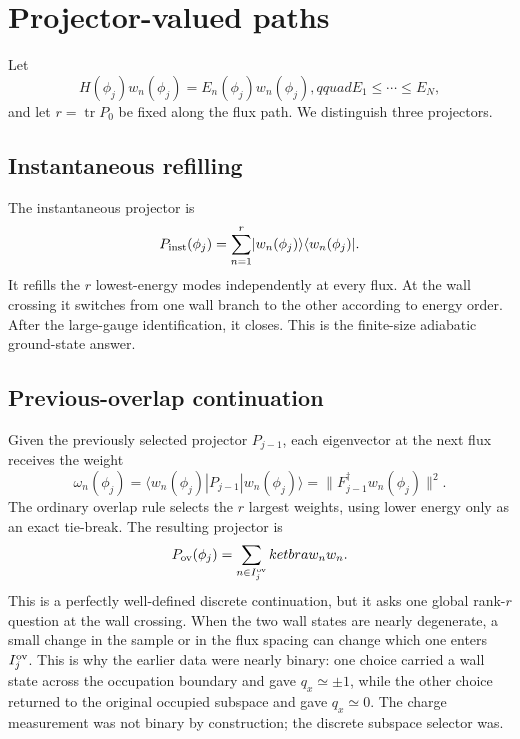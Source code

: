 \documentclass[aps,prb,twocolumn,floatfix,nofootinbib,superscriptaddress]{revtex4-2}
\newcommand{\tr}{\operatorname{tr}}
\newcommand{\ketbra}[2]{\lvert #1\rangle\langle #2\rvert}
\begin{document}
\section{Projector-valued paths}

Let
\begin{equation}
 H(\phi_j)w_n(\phi_j)=E_n(\phi_j)w_n(\phi_j),qquad
 E_1\le\cdots\le E_N,
 \label{eq:eigensystem}
\end{equation}
and let $r=\tr P_0$ be fixed along the flux path.  We distinguish three
projectors.

\subsection{Instantaneous refilling}

The instantaneous projector is
\begin{equation}
 P_{\rm inst}(\phi_j)=\sum_{n=1}^{r}\ketbra{w_n(\phi_j)}{w_n(\phi_j)}.
 \label{eq:instantaneous}
\end{equation}
It refills the $r$ lowest-energy modes independently at every flux.  At the
wall crossing it switches from one wall branch to the other according to
energy order.  After the large-gauge identification, it closes.  This is the
finite-size adiabatic ground-state answer.

\subsection{Previous-overlap continuation}

Given the previously selected projector $P_{j-1}$, each eigenvector at the
next flux receives the weight
\begin{equation}
 \omega_n(\phi_j)
 =\langle w_n(\phi_j)|P_{j-1}|w_n(\phi_j)\rangle
 =\|F_{j-1}^\dagger w_n(\phi_j)\|^2 .
 \label{eq:overlap-weight}
\end{equation}
The ordinary overlap rule selects the $r$ largest weights, using lower
energy only as an exact tie-break.  The resulting projector is
\begin{equation}
 P_{\rm ov}(\phi_j)=\sum_{n\in I_j^{\rm ov}}ketbra{w_n}{w_n}.
 \label{eq:overlap-projector}
\end{equation}
This is a perfectly well-defined discrete continuation, but it asks one
global rank-$r$ question at the wall crossing.  When the two wall states are
nearly degenerate, a small change in the sample or in the flux spacing can
change which one enters $I_j^{\rm ov}$.  This is why the earlier data were
nearly binary: one choice carried a wall state across the occupation boundary
and gave $q_x\simeq\pm1$, while the other choice returned to the original
occupied subspace and gave $q_x\simeq0$.  The charge measurement was not
binary by construction; the discrete subspace selector was.
\end{document}
